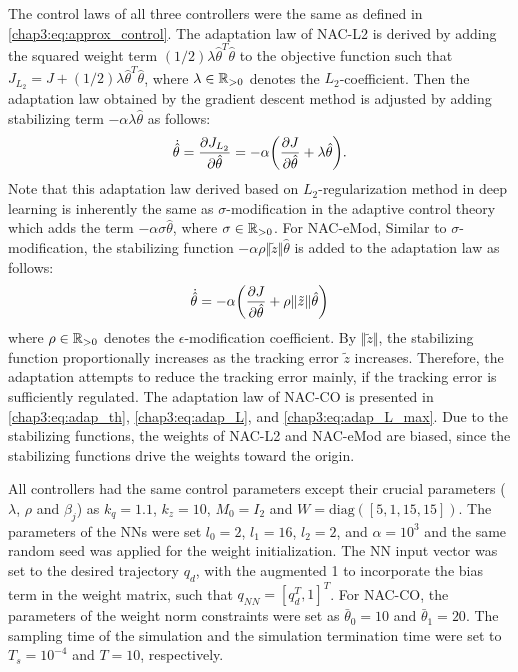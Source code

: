 The control laws of all three controllers were the same as defined in \eqref{chap3:eq:approx_control}.
The adaptation law of NAC-L2 is derived by adding the squared weight term $(1/2)\lambda\hat\theta^T\hat\theta$ to the objective function such that $J_{L_2} = J+(1/2)\lambda\hat\theta^T\hat\theta$, where $\lambda\in\mathbb{R}_{>0}$ denotes the $L_2$-coefficient.
Then the adaptation law obtained by the gradient descent method is adjusted by adding stabilizing term $-\alpha\lambda\hat\theta$ as follows:
\begin{equation} 
    \dot{\hat\theta} = 
    {\partial J_{L_2}\over\partial \hat\theta}
    =-\alpha
    \bigg(
        {\partial J\over\partial \hat\theta}+\lambda\hat\theta
    \bigg)
    .
    \label{chap3:eq:adap_L2}
\end{equation}
Note that this adaptation law derived based on $L_2$-regularization method in deep learning is inherently the same as $\sigma$-modification in the adaptive control theory which adds the term $-\alpha\sigma\hat\theta$, where $\sigma\in\mathbb{R}_{>0}$.
For NAC-eMod, Similar to $\sigma$-modification, the stabilizing function $-\alpha\rho\Vert \tilde z \Vert\hat\theta$ is added to the adaptation law as follows:
\begin{equation}
    \dot{\hat\theta} = -\alpha
    \bigg(
        {\partial J\over\partial \hat\theta}+\rho\Vert\tilde z\Vert\hat\theta
    \bigg)
    \label{chap3:eq:adap_eMod}
\end{equation}
where $\rho\in\mathbb{R}_{>0}$ denotes the $\epsilon$-modification coefficient.
By $\Vert\tilde z\Vert$, the stabilizing function proportionally increases as the tracking error $\tilde z$ increases.
Therefore, the adaptation attempts to reduce the tracking error mainly, if the tracking error is sufficiently regulated.
The adaptation law of NAC-CO is presented in \eqref{chap3:eq:adap_th}, \eqref{chap3:eq:adap_L}, and \eqref{chap3:eq:adap_L_max}.
Due to the stabilizing functions, the weights of NAC-L2 and NAC-eMod are biased, since the stabilizing functions drive the weights toward the origin.

All controllers had the same control parameters except their crucial parameters (\ie $\lambda$, $\rho$ and $\beta_j$) as $k_q=1.1$, $k_z=10$, $M_0=I_2$ and $W=\text{diag}([5,1,15,15])$.
The parameters of the NNs were set $l_0=2$, $l_1=16$, $l_2=2$, and $\alpha=10^3$ and the same random seed was applied for the weight initialization.
The NN input vector was set to the desired trajectory $q_d$, with the augmented 1 to incorporate the bias term in the weight matrix, such that $q_{NN}=[q_d^T,1]^T$. 
For NAC-CO, the parameters of the weight norm constraints were set as $\bar\theta_0=10$ and $\bar\theta_1=20$.
The sampling time of the simulation and the simulation termination time were set to $T_s=10^{-4}$ and $T=10$, respectively.

